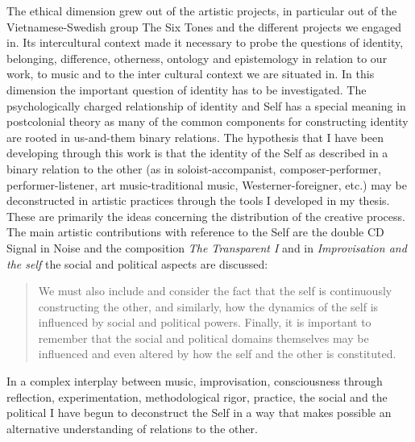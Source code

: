 \documentclass[a4paper]{article}
\begin{document}
The ethical dimension grew out of the artistic projects, in particular out of the Vietnamese-Swedish group The Six Tones and the different projects we engaged in. Its intercultural context made it necessary to probe the questions of identity, belonging, difference, otherness, ontology and epistemology in relation to our work, to music and to the inter cultural context we are situated in. In this dimension the important question of identity has to be investigated. The psychologically charged relationship of identity and Self has a special meaning in postcolonial theory as many of the common components for constructing identity are rooted in us-and-them binary relations. The hypothesis that I have been developing through this work is that the identity of the Self as described in a binary relation to the other (as in soloist-accompanist, composer-performer, performer-listener, art music-traditional music, Westerner-foreigner, etc.) may be deconstructed in artistic practices through the tools I developed in my thesis. These are primarily the ideas concerning the distribution of the creative process. The main artistic contributions with reference to the Self are the double CD Signal in Noise \citep{sixtones13} and the composition \emph{The Transparent I} \citep{frisk-transparent} and in \emph{Improvisation and the self} \citep{frisk12-improv} the social and political aspects are discussed:

\begin{quote}
  We must also include and consider the fact that the self is
  continuously constructing the other, and similarly, how the dynamics
  of the self is influenced by social and political powers. Finally,
  it is important to remember that the social and political domains
  themselves may be influenced and even altered by how the self and
  the other is constituted.
\end{quote}

In a complex interplay between music, improvisation, consciousness through reflection, experimentation, methodological rigor, practice, the social and the political I have begun to deconstruct the Self in a way that makes possible an alternative understanding of relations to the other.
\end{document}
